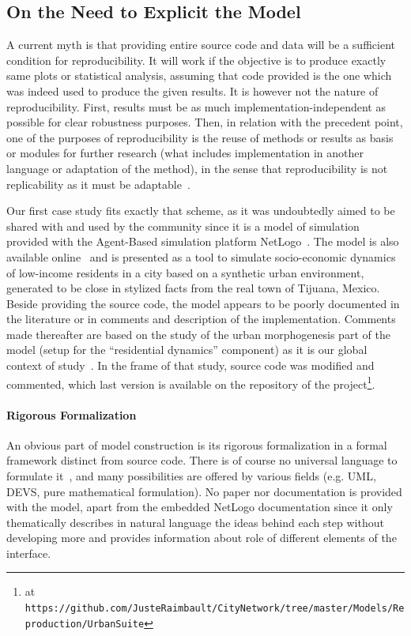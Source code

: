 \subsection{On the Need to Explicit the Model}

A current myth is that providing entire source code and data will be a sufficient condition for reproducibility. It will work if the objective is to produce exactly same plots or statistical analysis, assuming that code provided is the one which was indeed used to produce the given results. It is however not the nature of reproducibility. First, results must be as much implementation-independent as possible for clear robustness purposes. Then, in relation with the precedent point, one of the purposes of reproducibility is the reuse of methods or results as basis or modules for further research (what includes implementation in another language or adaptation of the method), in the sense that reproducibility is not replicability as it must be adaptable~\cite{drummond2009replicability}.

Our first case study fits exactly that scheme, as it was undoubtedly aimed to be shared with and used by the community since it is a model of simulation provided with the Agent-Based simulation platform NetLogo~\cite{wilensky1999netlogo}. The model is also available online~\cite{de2007netlogo} and is presented as a tool to simulate socio-economic dynamics of low-income residents in a city based on a synthetic urban environment, generated to be close in stylized facts from the real town of Tijuana, Mexico. Beside providing the source code, the model appears to be poorly documented in the literature or in comments and description of the implementation. Comments made thereafter are based on the study of the urban morphogenesis part of the model (setup for the ``residential dynamics'' component) as it is our global context of study~\cite{raimbault2014vers}. In the frame of that study, source code was modified and commented, which last version is available on the repository of the project\footnote{at \texttt{https://github.com/JusteRaimbault/CityNetwork/tree/master/Models/Reproduction/UrbanSuite}}.




\paragraph{Rigorous Formalization}

An obvious part of model construction is its rigorous formalization in a formal framework distinct from source code. There is of course no universal language to formulate it~\cite{banos2013pour}, and many possibilities are offered by various fields (e.g. UML, DEVS, pure mathematical formulation). No paper nor documentation is provided with the model, apart from the embedded NetLogo documentation since it only thematically describes in natural language the ideas behind each step without developing more and provides information about role of different elements of the interface.


